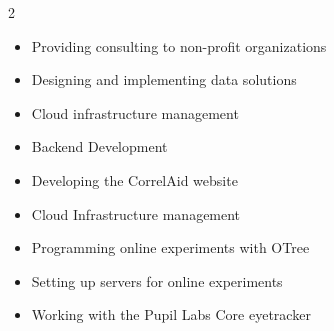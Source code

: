 \documentclass[10pt,a4paper,ragged2e,withhyper]{altacv}
\begin{document}

\makecvheader



\begin{paracol}{2}




            \begin{itemize}
                    \item Providing consulting to non-profit organizations
                    \item Designing and implementing data solutions
                    \item Cloud infrastructure management
                \end{itemize}
    
            \divider
    

            \begin{itemize}
                    \item Backend Development
                \end{itemize}
    
            \divider
    

            \begin{itemize}
                    \item Developing the CorrelAid website
                    \item Cloud Infrastructure management
                \end{itemize}
    
            \divider
    

            \begin{itemize}
                    \item Programming online experiments with OTree
                    \item Setting up servers for online experiments
                    \item Working with the Pupil Labs Core eyetracker
                \end{itemize}
    

\end{paracol}
\end{document}
